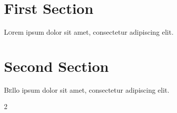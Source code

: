 \documentclass{article}
\begin{document}
    \begin{multicols}{2}
        \section{First Section}
        
        \lettrine[nindent=0em,lines=3]{L} orem ipsum dolor sit amet, consectetur adipiscing elit.
        \lipsum[2-3]

        \section{Second Section}
        \lettrine[nindent=0em,lines=3]{\color{red-600}B} ello ipsum dolor sit amet, consectetur adipiscing elit.
        \lipsum[4]
    \end{multicols}{2}
    
\end{document}
